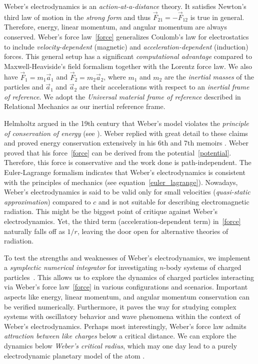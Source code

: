 \documentclass[12pt,a4paper]{article}
\theoremstyle{definition}
\theoremstyle{remark}
\begin{document}
Weber's electrodynamics is an \textit{action-at-a-distance} theory. It satisfies Newton's third law of motion in the \textit{strong form} and thus $\vec{F}_{21} = -\vec{F}_{12}$ is true in general. Therefore, energy, linear momentum, and angular momentum are always conserved. Weber's force law~\eqref{force} generalizes Coulomb's law for electrostatics to include \textit{velocity-dependent} (magnetic) and \textit{acceleration-dependent} (induction) forces. This general setup has a significant \textit{computational advantage} compared to Maxwell-Heaviside's field formalism together with the Lorentz force law. We also have $\vec{F}_1 = m_1\vec{a}_1$ and $\vec{F}_2 = m_2\vec{a}_2$, where $m_1$ and $m_2$ are the \textit{inertial masses} of the particles and $\vec{a}_1$ and $\vec{a}_2$ are their accelerations with respect to an \textit{inertial frame of reference}. We adopt the \textit{Universal material frame of reference} described in Relational Mechanics \citep{assis-relational-mechanics} as our inertial reference frame.

Helmholtz argued in the 19th century that Weber's model violates the \textit{principle of conservation of energy} (see \citep{assis-weber-vol4}). Weber replied with great detail to these claims and proved energy conservation extensively in his 6th and 7th memoirs \citep{assis-weber-vol4}. Weber proved that his force~\eqref{force} can be derived from the potential~\eqref{potential}. Therefore, this force is conservative and the work done is path-independent. The Euler-Lagrange formalism indicates that Weber's electrodynamics is consistent with the principles of mechanics (see equation~\eqref{euler_lagrange}). Nowadays, Weber's electrodynamics is said to be valid only for small velocities (\textit{quasi-static approximation}) compared to $c$ and is not suitable for describing electromagnetic radiation. This might be the biggest point of critique against Weber's electrodynamics. Yet, the third term (acceleration-dependent term) in~\eqref{force} naturally falls off as $1/r$, leaving the door open for alternative theories of radiation.

To test the strengths and weaknesses of Weber's electrodynamics, we implement a \textit{symplectic numerical integrator} for investigating $n$-body systems of charged particles~\citep{WeberElectrodynamics.jl}. This allows us to explore the dynamics of charged particles interacting via Weber's force law~\eqref{force} in various configurations and scenarios. Important aspects like energy, linear momentum, and angular momentum conservation can be verified numerically. Furthermore, it paves the way for studying complex systems with oscillatory behavior and wave phenomena within the context of Weber's electrodynamics. Perhaps most interestingly, Weber's force law admits \textit{attraction between like charges} below a critical distance. We can explore the dynamics below \textit{Weber's critical radius}, which may one day lead to a purely electrodynamic planetary model of the atom \citep{assis-planetary-model}.
\end{document}
